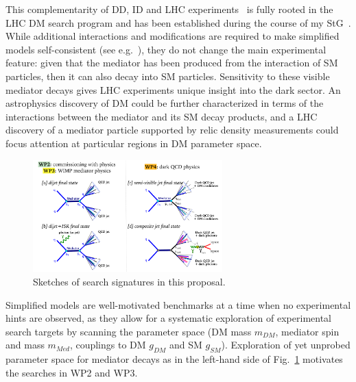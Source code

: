 This complementarity of DD, ID and LHC experiments~\cite{Bauer:2013ihz} is fully rooted in the LHC DM search program and has been established during the course of my StG~\cite{Boveia:2016mrp}.
\indent
While additional interactions and modifications are required to make simplified models self-consistent (see e.g.~\cite{Ellis:2018xal}), they do not change the main experimental feature: given that the mediator has been produced from the interaction of SM particles, then it can also decay into SM particles. 
Sensitivity to these visible mediator decays gives LHC experiments unique insight into the dark sector. 
An astrophysics discovery of DM could be further characterized in terms of the interactions between the mediator and its SM decay products, 
and a LHC discovery of a mediator particle supported by relic density measurements could focus attention at particular regions in DM parameter space. 

\begin{figure} 
\begin{center}
\includegraphics[width=0.65\textwidth]{figs_B2/feynman.pdf}
\caption{Sketches of search signatures in this proposal.\color{black}\label{fig:feynman} }
\vskip2pt
\end{center}
\end{figure}

Simplified models are well-motivated benchmarks at a time when no experimental hints are observed, as they allow for a systematic exploration of experimental search targets by scanning the parameter space (DM mass $m_{DM}$, mediator spin and mass $m_{Med}$, couplings to DM $g_{DM}$ and SM $g_{SM}$).
Exploration of yet unprobed parameter space for mediator decays as in the left-hand side of Fig.~\ref{fig:feynman} motivates the searches in WP2 and WP3. 


